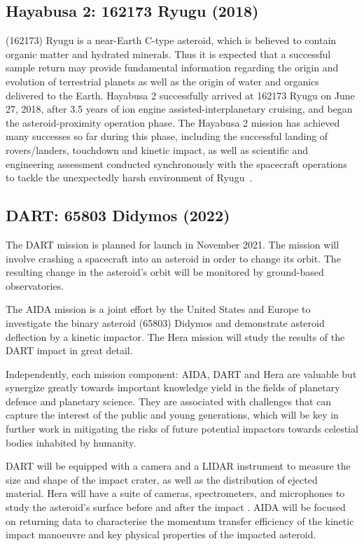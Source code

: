 \subsection{Hayabusa 2: 162173 Ryugu (2018)}

(162173) Ryugu is a near-Earth C-type asteroid, which is believed to contain organic matter and hydrated minerals. Thus it is expected that a successful sample return may provide fundamental information regarding the origin and evolution of terrestrial planets as well as the origin of water and organics delivered to the Earth. Hayabusa 2 successfully arrived at 162173 Ryugu on June 27, 2018, after 3.5 years of ion engine assisted-interplanetary cruising, and began the asteroid-proximity operation phase. The Hayabusa 2 mission has achieved many successes so far during this phase, including the successful landing of rovers/landers, touchdown and kinetic impact, as well as scientific and engineering assessment conducted synchronously with the spacecraft operations to tackle the unexpectedly harsh environment of Ryugu~\cite{Tsuda2020}. 

\subsection{DART: 65803 Didymos (2022)}

The DART mission is planned for launch in November 2021. The mission will involve crashing a spacecraft into an asteroid in order to change its orbit. The resulting change in the asteroid's orbit will be monitored by ground-based observatories.

The \gls{AIDA} mission is a joint effort by the United States and Europe to investigate the binary asteroid (65803) Didymos and demonstrate asteroid deflection by a kinetic impactor. The Hera mission will study the results of the DART impact in great detail. 

Independently, each mission component: \gls{AIDA}, \gls{DART} and Hera are valuable but synergize greatly towards important knowledge yield in the fields of planetary defence and planetary science. They are associated with challenges that can capture the interest of the public and young generations, which will be key in further work in mitigating the risks of future potential impactors towards celestial bodies inhabited by humanity.

\gls{DART} will be equipped with a camera and a \gls{LIDAR} instrument to measure the size and shape of the impact crater, as well as the distribution of ejected material. Hera will have a suite of cameras, spectrometers, and microphones to study the asteroid's surface before and after the impact \cite{Cheng2012, Rivkin2021}. \gls{AIDA} will be focused on returning data to characterise the momentum transfer efficiency of the kinetic impact manoeuvre and key physical properties of the impacted asteroid. 

